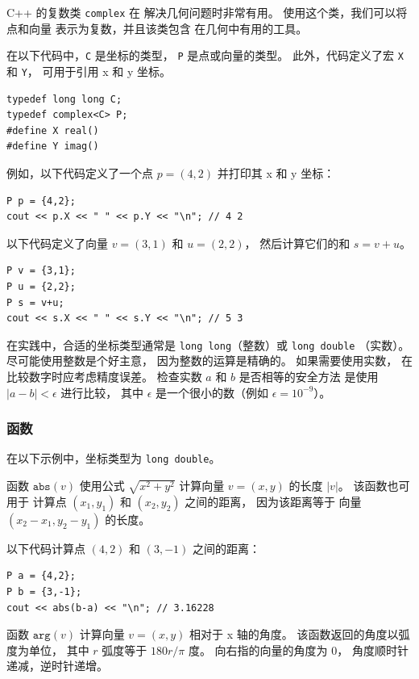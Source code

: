 
C++ 的复数类 \texttt{complex} 在
解决几何问题时非常有用。
使用这个类，我们可以将点和向量
表示为复数，并且该类包含
在几何中有用的工具。

在以下代码中，\texttt{C} 是坐标的类型，
\texttt{P} 是点或向量的类型。
此外，代码定义了宏 \texttt{X} 和 \texttt{Y}，
可用于引用 x 和 y 坐标。

\begin{lstlisting}
typedef long long C;
typedef complex<C> P;
#define X real()
#define Y imag()
\end{lstlisting}

例如，以下代码定义了一个点 $p=(4,2)$
并打印其 x 和 y 坐标：

\begin{lstlisting}
P p = {4,2};
cout << p.X << " " << p.Y << "\n"; // 4 2
\end{lstlisting}

以下代码定义了向量 $v=(3,1)$ 和 $u=(2,2)$，
然后计算它们的和 $s=v+u$。

\begin{lstlisting}
P v = {3,1};
P u = {2,2};
P s = v+u;
cout << s.X << " " << s.Y << "\n"; // 5 3
\end{lstlisting}

在实践中，合适的坐标类型通常是
\texttt{long long}（整数）或 \texttt{long double}
（实数）。
尽可能使用整数是个好主意，
因为整数的运算是精确的。
如果需要使用实数，
在比较数字时应考虑精度误差。
检查实数 $a$ 和 $b$ 是否相等的安全方法
是使用 $|a-b|<\epsilon$ 进行比较，
其中 $\epsilon$ 是一个很小的数（例如 $\epsilon=10^{-9}$）。

\subsubsection*{函数}

在以下示例中，坐标类型为
\texttt{long double}。

函数 $\texttt{abs}(v)$ 使用公式
$\sqrt{x^2+y^2}$ 计算向量 $v=(x,y)$
的长度 $|v|$。
该函数也可用于
计算点
$(x_1,y_1)$ 和 $(x_2,y_2)$ 之间的距离，
因为该距离等于
向量 $(x_2-x_1,y_2-y_1)$ 的长度。

以下代码计算点
$(4,2)$ 和 $(3,-1)$ 之间的距离：
\begin{lstlisting}
P a = {4,2};
P b = {3,-1};
cout << abs(b-a) << "\n"; // 3.16228
\end{lstlisting}

函数 $\texttt{arg}(v)$ 计算向量
$v=(x,y)$ 相对于 x 轴的角度。
该函数返回的角度以弧度为单位，
其中 $r$ 弧度等于 $180 r/\pi$ 度。
向右指的向量的角度为 0，
角度顺时针递减，逆时针递增。


